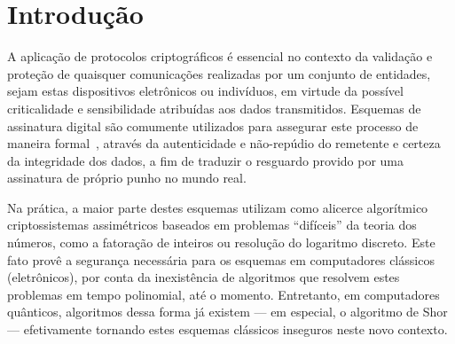 \documentclass{ufsctex/ufsctex}
\begin{document}

\capa{}
\folhaaprovacao{}
\folhaderosto{}
\paginadedicatoria{}
\paginaagradecimento{}
\paginaepigrafe{}
\paginaresumo{}
\paginaabstract{}

\listadefiguras{}
\listadetabelas{}
\listadeabreviaturas{}
\listadesimbolos{}
\listofalgorithms{}

\sumario{}

\chapter{Introdução}\label{chapter:intro}

A aplicação de protocolos criptográficos é essencial no contexto da validação e
proteção de quaisquer comunicações realizadas por um conjunto de entidades,
sejam estas dispositivos eletrônicos ou indivíduos, em virtude da possível
criticalidade e sensibilidade atribuídas aos dados transmitidos. Esquemas de
assinatura digital são comumente utilizados para assegurar este processo de
maneira formal~\cite{Goldreich:2004:FCV:975541}, através da autenticidade e
não-repúdio do remetente e certeza da integridade dos dados, a fim de traduzir
o resguardo provido por uma assinatura de próprio punho no mundo real.

Na prática, a maior parte destes esquemas utilizam como alicerce algorítmico
criptossistemas assimétricos baseados em problemas ``difíceis'' da teoria dos
números, como a fatoração de inteiros ou resolução do logaritmo discreto.  Este
fato provê a segurança necessária para os esquemas em computadores clássicos
(eletrônicos), por conta da inexistência de algoritmos que resolvem estes
problemas em tempo polinomial, até o momento.  Entretanto, em computadores
quânticos, algoritmos dessa forma já existem --- em especial, o algoritmo de
Shor~\cite{Shor:1997:PAP:264393.264406} --- efetivamente tornando estes esquemas
clássicos inseguros neste novo contexto.
\end{document}

